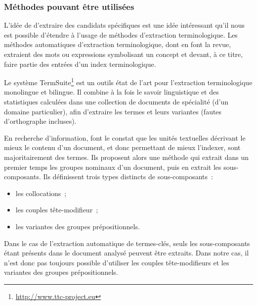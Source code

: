     \subsubsection{Méthodes pouvant être utilisées}
    \label{subsubsec:methodes_pouvant_etre_utilisees}
    
      L'idée de  d'extraire des candidats
      spécifiques est une idée intéressant qu'il nous est possible d'étendre à
      l'usage de méthodes d'extraction terminologique. Les méthodes automatiques
      d'extraction terminologique, dont
       en font la revue, extraient
      des mots ou expressions symbolisant un concept et devant, à ce titre,
      faire partie des entrées d'un index terminologique.

      Le système TermSuite\footnote{\url{http://www.ttc-project.eu}} est un
      outils état de l'art pour l'extraction terminologique monolingue et
      bilingue. Il combine à la fois le savoir linguistique et des statistiques
      calculées dans une collection de documents de spécialité (d'un domaine
      particulier), afin d'extraire les termes et leurs variantes (fautes
      d'orthographe incluses).

      En recherche d'information,  font le
      constat que les unités textuelles décrivant le mieux le contenu d'un
      document, et donc permettant de mieux l'indexer, sont majoritairement des
      termes. Ils proposent alors une méthode qui extrait dans un premier temps
      les groupes nominaux d'un document, puis en extrait les sous-composants.
      Ils définissent trois types distincts de sous-composants~:
      \begin{itemize}
        \item{les collocations~;}
        \item{les couples tête-modifieur~;}
        \item{les variantes des groupes prépositionnels.}
      \end{itemize}
      Dans le cas de l'extraction automatique de termes-clés, seuls les
      sous-composants étant présents dans le document analysé peuvent être
      extraits. Dans notre cas, il n'est donc pas toujours possible d'utiliser
      les couples tête-modifieurs et les variantes des groupes prépositionnels.

